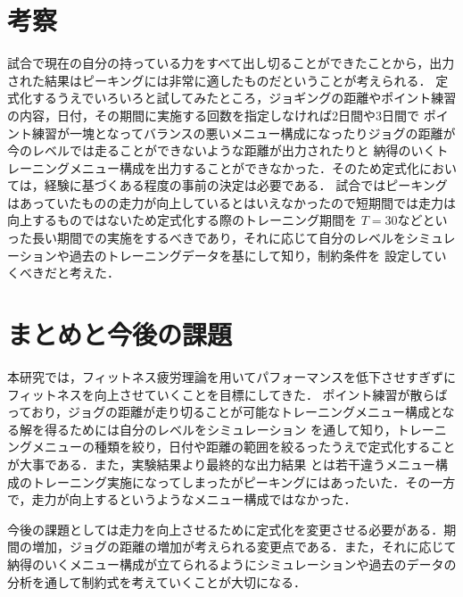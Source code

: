\documentclass[12pt,fleqn]{jreport}
\begin{document}
\chapter{考察}
\vspace{1cm}
試合で現在の自分の持っている力をすべて出し切ることができたことから，出力された結果はピーキングには非常に適したものだということが考えられる．
定式化するうえでいろいろと試してみたところ，ジョギングの距離やポイント練習の内容，日付，その期間に実施する回数を指定しなければ2日間や3日間で
ポイント練習が一塊となってバランスの悪いメニュー構成になったりジョグの距離が今のレベルでは走ることができないような距離が出力されたりと
納得のいくトレーニングメニュー構成を出力することができなかった．そのため定式化においては，経験に基づくある程度の事前の決定は必要である．
試合ではピーキングはあっていたものの走力が向上しているとはいえなかったので短期間では走力は向上するものではないため定式化する際のトレーニング期間を
$T=30$などといった長い期間での実施をするべきであり，それに応じて自分のレベルをシミュレーションや過去のトレーニングデータを基にして知り，制約条件を
設定していくべきだと考えた．
\newpage
\chapter{まとめと今後の課題}
\vspace{1cm}
本研究では，フィットネス疲労理論を用いてパフォーマンスを低下させすぎずにフィットネスを向上させていくことを目標にしてきた．
ポイント練習が散らばっており，ジョグの距離が走り切ることが可能なトレーニングメニュー構成となる解を得るためには自分のレベルをシミュレーション
を通して知り，トレーニングメニューの種類を絞り，日付や距離の範囲を絞るったうえで定式化することが大事である．また，実験結果より最終的な出力結果
とは若干違うメニュー構成のトレーニング実施になってしまったがピーキングにはあったいた．その一方で，走力が向上するというようなメニュー構成ではなかった．
\par 今後の課題としては走力を向上させるために定式化を変更させる必要がある．期間の増加，ジョグの距離の増加が考えられる変更点である．また，それに応じて
納得のいくメニュー構成が立てられるようにシミュレーションや過去のデータの分析を通して制約式を考えていくことが大切になる．
\end{document}
